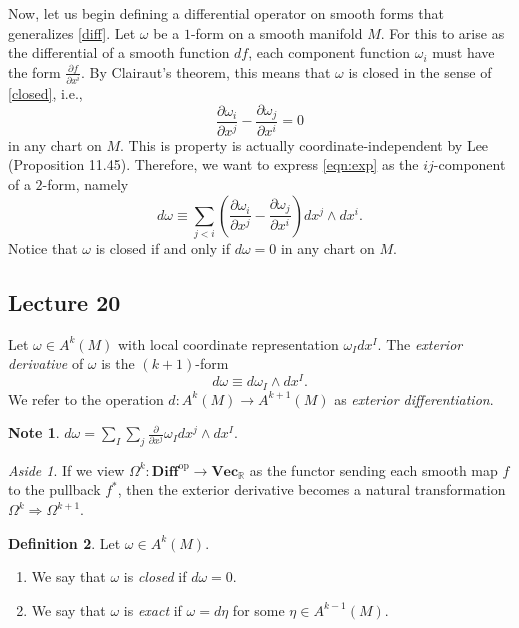 \documentclass[10pt,letterpaper,cm]{nupset}
\theoremstyle{definition}
\newtheorem{definition}{Definition}[subsection]
\newtheorem{note}[definition]{Note}
\theoremstyle{theorem}
\theoremstyle{remark}
\newtheorem*{aside}{Aside}
\newcommand{\R}{\mathbb R}
\newcommand{\1}{\mathbf{1}}
\newcommand{\0}{\vec 0}
\DeclareMathOperator{\op}{op}
\begin{document}
\bigskip

Now, let us begin defining a differential operator on smooth forms that generalizes \cref{diff}. Let $\omega$ be a $1$-form on a smooth manifold $M$. For this to arise as the differential of a smooth function $d{f}$, each component function $\omega_i$ must have the form $\frac{\partial{f}}{\partial{x^i}}$. By Clairaut's theorem, this means that $\omega$ is closed in the sense of \cref{closed}, i.e.,
\[ \label{eqn:exp}
\frac{\partial{\omega_i}}{\partial{x^j}} - \frac{\partial{\omega_j}}{\partial{x^i}} =0 \tag{$\ast$}
\] in any chart on $M$.
This is property is actually coordinate-independent by Lee (Proposition 11.45). Therefore, we want to express \eqref{eqn:exp} as the $ij$-component of a $2$-form, namely
\[
d{\omega}\equiv \sum_{j<i}\left(\frac{\partial \omega_{i}}{\partial x^{j}}-\frac{\partial \omega_{j}}{\partial x^{i}}\right) d x^{j} \wedge d x^{i}.
\] Notice that $\omega$ is closed if and only if $d{\omega} =0$ in any chart on $M$.

\subsection{Lecture 20}


Let $\omega \in A^k(M)$ with local coordinate representation $\omega_I dx^I$. The \textit{exterior derivative} of $\omega$ is the $\left(k+1\right)$-form $$d\omega \equiv d \omega_I \wedge dx^I.$$ We refer to the operation $d : A^k(M) \to A^{k+1}(M)$ as \textit{exterior differentiation}.


\begin{note}
$d \omega = \sum_I\sum_j\frac{\partial}{\partial{x^j}}\omega_I dx^j \wedge dx^I.$
\end{note}

\begin{aside}
If we view $\Omega^k : \mathbf{Diff}^{\op} \to \mathbf{Vec}_{\R}$ as the functor sending each smooth map $f$ to the pullback $f^{\ast}$, then the exterior derivative becomes a natural transformation $\Omega^k \Rightarrow \Omega^{k+1}$.  
\end{aside}

\begin{definition} Let $\omega \in A^k(M)$.
\begin{enumerate}
\item We say that $\omega$ is \textit{closed} if $d \omega = 0$.
\item We say that $\omega$ is \textit{exact} if $\omega = d \eta$ for some $\eta \in A^{k-1}(M)$.
\end{enumerate}
\end{definition}
\end{document}
